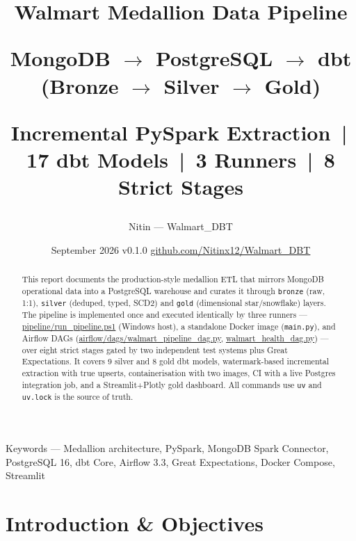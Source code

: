 \documentclass[11pt,a4paper]{article}
\title{
  \vspace{1.2cm}
  {\Huge\bfseries Walmart Medallion Data Pipeline\par}
  \vspace{0.35cm}
  {\Large MongoDB $\rightarrow$ PostgreSQL $\rightarrow$ dbt \quad (Bronze $\rightarrow$ Silver $\rightarrow$ Gold)\par}
  \vspace{0.45cm}
  {\large Incremental PySpark Extraction \,|\, 17 dbt Models \,|\, 3 Runners \,|\, 8 Strict Stages\par}
}
\author{
  Nitin \quad\textcolor{muted}{— Walmart\_DBT}
}
\date{
  September 2026 \quad\textcolor{muted}{\textbar\quad} v0.1.0 \quad\textcolor{muted}{\textbar\quad}
  \href{https://github.com/Nitinx12/Walmart_DBT}{github.com/Nitinx12/Walmart\_DBT}
}
\begin{document}
\maketitle
\thispagestyle{empty}
\begin{center}
\end{center}
\vspace{0.6cm}
\begin{abstract}
\noindent
This report documents the production-style medallion ETL that mirrors MongoDB operational data into a PostgreSQL warehouse and curates it through \texttt{bronze} (raw, 1:1), \texttt{silver} (deduped, typed, SCD2) and \texttt{gold} (dimensional star/snowflake) layers. The pipeline is implemented once and executed identically by three runners — \url{pipeline/run_pipeline.ps1} (Windows host), a standalone Docker image (\texttt{main.py}), and Airflow DAGs (\url{airflow/dags/walmart_pipeline_dag.py}, \url{walmart_health_dag.py}) — over eight strict stages gated by two independent test systems plus Great Expectations. It covers 9 silver and 8 gold dbt models, watermark-based incremental extraction with true upserts, containerisation with two images, CI with a live Postgres integration job, and a Streamlit+Plotly gold dashboard. All commands use \texttt{uv} and \texttt{uv.lock} is the source of truth.
\end{abstract}
\vspace{0.3cm}
\begin{center}
\small\textcolor{muted}{Keywords —} Medallion architecture, PySpark, MongoDB Spark Connector, PostgreSQL 16, dbt Core, Airflow 3.3, Great Expectations, Docker Compose, Streamlit
\end{center}
\newpage
\tableofcontents
\newpage

\section{Introduction \& Objectives}
\end{document}
